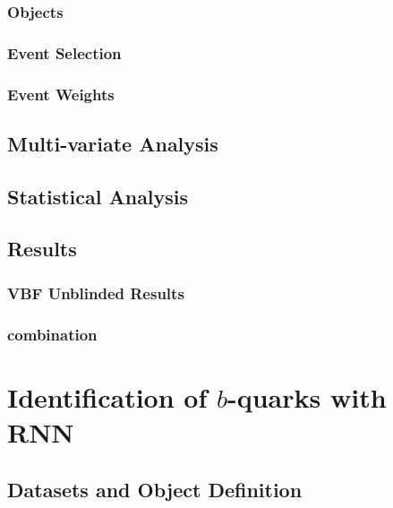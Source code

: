 \documentclass{report}
\begin{document}
\subsection{Objects}

\subsection{Event Selection}

\subsection{Event Weights}

\clearpage

\section{Multi-variate Analysis}

\clearpage

\section{Statistical Analysis}

\clearpage

\section{Results}
\subsection{VBF \Hbb Unblinded Results}

\clearpage
\subsection{\Hbb combination}


\clearpage


\chapter{Identification of $b$-quarks with RNN}
\label{chap:btagging}


\clearpage

\section{Datasets and Object Definition}

\clearpage
\end{document}
